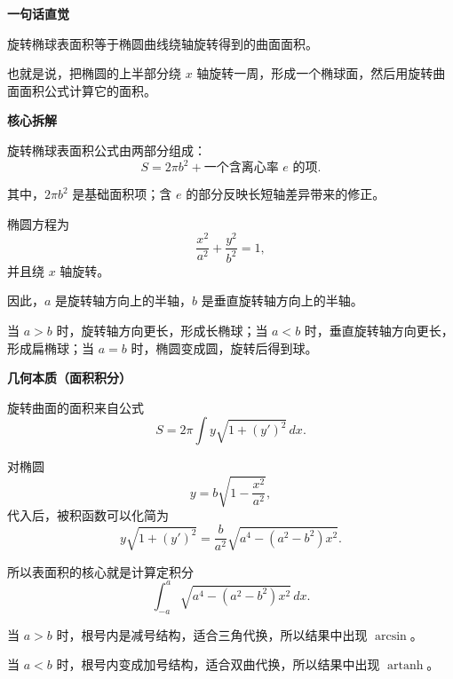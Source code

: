 \begin{explanationbox}

	\textbf{\textcolor{CExplanation}{一句话直觉}}

	旋转椭球表面积等于椭圆曲线绕轴旋转得到的曲面面积。

	也就是说，把椭圆的上半部分绕 $x$ 轴旋转一周，形成一个椭球面，然后用旋转曲面面积公式计算它的面积。

	\medskip

	\textbf{\textcolor{CExplanation}{核心拆解}}

	\begin{description}[style=nextline, leftmargin=2.8em, labelsep=0.5em, itemsep=0.45em]

		\item[\textbf{要点一（公式结构）：}]
		      旋转椭球表面积公式由两部分组成：
		      \[
			      S
			      =
			      2\pi b^{2}
			      +
			      \text{一个含离心率 } e \text{ 的项}.
		      \]

		      其中，$2\pi b^{2}$ 是基础面积项；含 $e$ 的部分反映长短轴差异带来的修正。

		\item[\textbf{要点二（参数角色）：}]
		      椭圆方程为
		      \[
			      \frac{x^{2}}{a^{2}}+\frac{y^{2}}{b^{2}}=1,
		      \]
		      并且绕 $x$ 轴旋转。

		      因此，$a$ 是旋转轴方向上的半轴，$b$ 是垂直旋转轴方向上的半轴。

		      当 $a>b$ 时，旋转轴方向更长，形成长椭球；当 $a<b$ 时，垂直旋转轴方向更长，形成扁椭球；当 $a=b$ 时，椭圆变成圆，旋转后得到球。

	\end{description}

	\medskip

	\textbf{\textcolor{CExplanation}{几何本质（面积积分）}}

	旋转曲面的面积来自公式
	\[
		S
		=
		2\pi\int y\sqrt{1+(y')^{2}}\,dx.
	\]

	对椭圆
	\[
		y=b\sqrt{1-\frac{x^{2}}{a^{2}}},
	\]
	代入后，被积函数可以化简为
	\[
		y\sqrt{1+(y')^{2}}
		=
		\frac{b}{a^{2}}
		\sqrt{a^{4}-(a^{2}-b^{2})x^{2}}.
	\]

	所以表面积的核心就是计算定积分
	\[
		\int_{-a}^{a}
		\sqrt{a^{4}-(a^{2}-b^{2})x^{2}}\,dx.
	\]

	当 $a>b$ 时，根号内是减号结构，适合三角代换，所以结果中出现 $\arcsin$。

	当 $a<b$ 时，根号内变成加号结构，适合双曲代换，所以结果中出现 $\operatorname{artanh}$。


\end{explanationbox}
